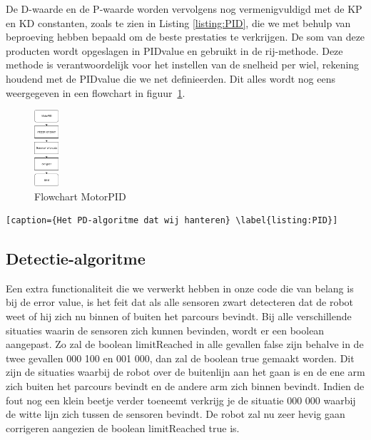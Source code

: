 De D-waarde en de P-waarde worden vervolgens nog vermenigvuldigd met de KP en KD constanten, zoals te zien in Listing \ref{listing:PID},  die we met behulp van beproeving hebben bepaald om de beste prestaties te verkrijgen. De som van deze producten wordt opgeslagen in PIDvalue en gebruikt in de rij-methode. Deze methode is verantwoordelijk voor het instellen van de snelheid per wiel, rekening houdend met de PIDvalue die we net definieerden. Dit alles wordt nog eens weergegeven in een flowchart in figuur~\ref{fig:flowchartMotor}.

\begin{figure}[h]
\centering
\includegraphics[width=0.08\textwidth]{MotorPIDFlowchart.png}
\caption{Flowchart MotorPID}
\label{fig:flowchartMotor}
\end{figure}



\begin{lstlisting}[caption={Het PD-algoritme dat wij hanteren} \label{listing:PID}]
\end{lstlisting}



\subsection{Detectie-algoritme}

Een extra functionaliteit die we verwerkt hebben in onze code die van belang is bij de error value, is het feit dat als alle sensoren zwart detecteren dat de robot weet of hij zich nu binnen of buiten het parcours bevindt. Bij alle verschillende situaties waarin de sensoren zich kunnen bevinden, wordt er een boolean aangepast. Zo zal de boolean limitReached in alle gevallen false zijn behalve in de twee gevallen 000 100 en 001 000, dan zal de boolean true gemaakt worden. Dit zijn de situaties waarbij de robot over de buitenlijn aan het gaan is en de ene arm zich buiten het parcours bevindt en de andere arm zich binnen bevindt. Indien de fout nog een klein beetje verder toeneemt verkrijg je de situatie 000 000 waarbij de witte lijn zich tussen de sensoren bevindt. De robot zal nu zeer hevig gaan corrigeren aangezien de boolean limitReached true is. 

